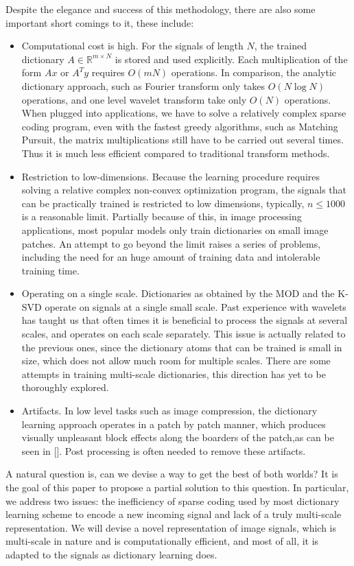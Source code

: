 \documentclass[a4paper]{article}
\begin{document}
Despite the elegance and success of this methodology, there are also some important short comings to it, these include:
\begin{itemize}
	\item Computational cost is high. For the signals of length $N$, the trained dictionary $A\in \mathbb{R}^{m\times N}$ is stored and used explicitly. Each multiplication of the form $Ax$ or $A^Ty$ requires $O(mN)$ operations. In comparison, the analytic dictionary approach, such as Fourier transform only takes $O(N\log N)$ operations, and one level wavelet transform take only $O(N)$ operations. When plugged into applications, we have to solve a relatively complex sparse coding program, even with the fastest greedy algorithms, such as Matching Pursuit, the matrix multiplications still have to be carried out several times. Thus it is much less efficient compared to traditional transform methods.
	\item Restriction to low-dimensions. Because the learning procedure requires solving a relative complex non-convex optimization program, the signals that can be practically trained is restricted to low dimensions, typically, $n\leq 1000$ is a reasonable limit. Partially because of this, in image processing applications, most popular models only train dictionaries on small image patches. An attempt to go beyond the limit raises a series of problems, including the need for an huge amount of training data and intolerable training time.
	\item Operating on a single scale. Dictionaries as obtained by the MOD and the K-SVD operate on signals at a single small scale. Past experience with wavelets has taught us that often times it is beneficial to process the signals at several scales, and operates on each scale separately. This issue is actually related to the previous ones, since the dictionary atoms that can be trained is small in size, which does not allow much room for multiple scales. There are some attempts in training multi-scale dictionaries, this direction has yet to be thoroughly explored.
	\item Artifacts.  In low level tasks such as image compression, the dictionary learning approach operates in a patch by patch manner, which produces visually unpleasant block effects along the boarders of the patch,as can be seen in [].  Post processing is often needed to remove these artifacts. 
\end{itemize}

A natural question is, can we devise a way to get the best of both worlds? It is the goal of this paper to propose a partial solution to this question. In particular, we address two issues: the inefficiency of sparse coding used by most dictionary learning scheme to encode a new incoming signal and lack of a truly multi-scale representation. We will devise a novel representation of image signals, which is multi-scale in nature and is computationally efficient, and most of all, it is adapted to the signals as dictionary learning does.
\end{document}
